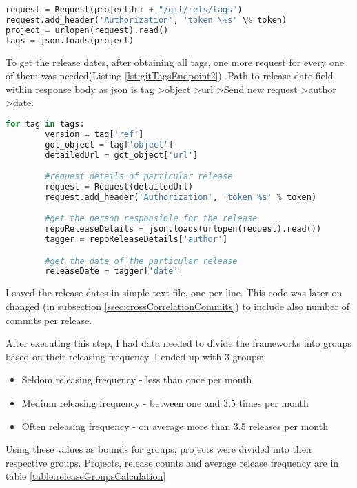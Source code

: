 \begin{lstlisting}[caption={Requesting all project tags git api tags endpoint},label={lst:gitTagsEndpoint},language=Python]
request = Request(projectUri + "/git/refs/tags")
request.add_header('Authorization', 'token \%s' \% token)
project = urlopen(request).read()
tags = json.loads(project)
\end{lstlisting}

To get the release dates, after obtaining all tags, one more request for every one of them was needed(Listing \ref{lst:gitTagsEndpoint2}). Path to release date field within response body as json is tag \textgreater  object \textgreater  url \textgreater  Send new request \textgreater  author \textgreater  date.

\begin{lstlisting}[caption={Requesting tag details and accessing release date},label={lst:gitTagsEndpoint2},language=Python]
	for tag in tags:
		version = tag['ref']
		got_object = tag['object']
		detailedUrl = got_object['url']

		#request details of particular release
		request = Request(detailedUrl)
		request.add_header('Authorization', 'token %s' % token)

		#get the person responsible for the release
		repoReleaseDetails = json.loads(urlopen(request).read())
		tagger = repoReleaseDetails['author']

		#get the date of the particular release
		releaseDate = tagger['date']
\end{lstlisting}

I saved the release dates in simple text file, one per line. This code was later on changed (in subsection \ref{ssec:crossCorrelationCommits}) to include also number of commits per release.

After executing this step, I had data needed to divide the frameworks into groups based on their releasing frequency. I ended up with 3 groups:
\begin{itemize}
\item{Seldom releasing frequency} - less than once per month
\item{Medium releasing frequency} - between one and 3.5 times per month
\item{Often releasing frequency} - on average more than 3.5 releases per month
\end{itemize}

Using these values as bounds for groups, projects were divided into their respective groups. Projects, release counts and average release frequency are in table \ref{table:releaseGroupsCalculation}

